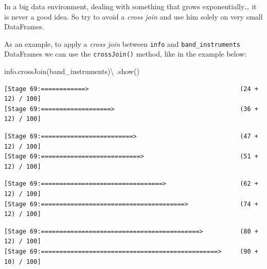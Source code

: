 \documentclass[
  11pt,
  letterpaper,
  DIV=11,
  numbers=noendperiod]{scrreprt}
\newenvironment{Shaded}{\begin{snugshade}}{\end{snugshade}}
\newcommand{\NormalTok}[1]{\textcolor[rgb]{0.00,0.23,0.31}{#1}}
\newcommand{\OperatorTok}[1]{\textcolor[rgb]{0.37,0.37,0.37}{#1}}
\begin{document}
In a big data environment, dealing with something that grows
exponentially\ldots{} it is never a good idea. So try to avoid a
\emph{cross join} and use him solely on very small DataFrames.

As an example, to apply a \emph{cross join} between \texttt{info} and
\texttt{band\_instruments} DataFrames we can use the
\texttt{crossJoin()} method, like in the example below:

\begin{Shaded}
\begin{Highlighting}[]
\NormalTok{info.crossJoin(band\_instruments)}\OperatorTok{\textbackslash{}}
\NormalTok{    .show()}
\end{Highlighting}
\end{Shaded}

\begin{verbatim}
[Stage 69:============>                                         (24 + 12) / 100]
[Stage 69:===================>                                  (36 + 12) / 100]
\end{verbatim}

\begin{verbatim}
[Stage 69:=========================>                            (47 + 12) / 100]
[Stage 69:===========================>                          (51 + 12) / 100]
\end{verbatim}

\begin{verbatim}
[Stage 69:=================================>                    (62 + 12) / 100]
[Stage 69:=======================================>              (74 + 12) / 100]
\end{verbatim}

\begin{verbatim}
[Stage 69:===========================================>          (80 + 12) / 100]
[Stage 69:================================================>     (90 + 10) / 100]
\end{verbatim}

\begin{verbatim}
                                                                                
\end{verbatim}
\end{document}
